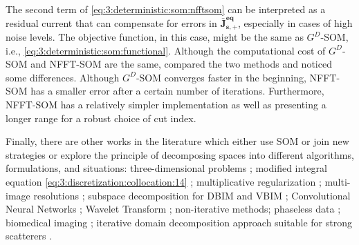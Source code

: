 			The second term of \eqref{eq:3:deterministic:som:nfftsom} can be interpreted as a residual current that can compensate for errors in $\mathbf{\bar{J}^{eq}_{s,+}} $, especially in cases of high noise levels. The objective function, in this case, might be the same as $G^D$-SOM, i.e., \eqref{eq:3:deterministic:som:functional}. Although the computational cost of $G^D$-SOM and NFFT-SOM are the same, \citep{chen2017} compared the two methods and noticed some differences. Although $G^D$-SOM converges faster in the beginning, NFFT-SOM has a smaller error after a certain number of iterations. Furthermore, NFFT-SOM has a relatively simpler implementation as well as presenting a longer range for a robust choice of cut index.
			
			Finally, there are other works in the literature which either use SOM or join new strategies or explore the principle of decomposing spaces into different algorithms, formulations, and situations: three-dimensional problems \citep{zhong2011fft}; modified integral equation \eqref{eq:3:discretization:collocation:14} \citep{zhong2016new,xu2018hybrid,xu2018fast,xu2020fourier}; multiplicative regularization \citep{xu2016multiplicative}; multi-image resolutions \citep{oliveri2011multiresolution,zhong2020multiresolution}; subspace decomposition for DBIM \citep{ye2017subspace} and VBIM \citep{liu2019subspace}; Convolutional Neural Networks \citep{wei2019physics}; Wavelet Transform \citep{zhang2020wavelet}; non-iterative methods\citep{yin2020noniterative}; phaseless data \citep{zhang2020solving}; biomedical imaging \citep{xu2018algorithm}; iterative domain decomposition approach suitable for strong scatterers \cite{zhang2022iterative}.
			
